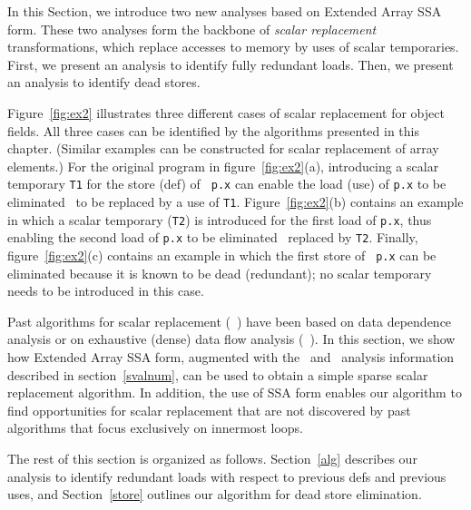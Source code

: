 In this Section, we introduce two new analyses based on Extended
Array SSA form.  These two analyses form the backbone of 
{\em scalar replacement} transformations, which replace accesses
to memory by uses of scalar temporaries.  First, we present an
analysis to identify fully redundant loads.  Then, we present an
analysis to identify dead stores.

Figure~\ref{fig:ex2} illustrates three different cases of scalar
replacement for object fields. 
All three cases can be identified by the algorithms presented in this chapter.
(Similar examples can 
be constructed for scalar replacement of array elements.)
For the original program in figure~\ref{fig:ex2}(a),
introducing a scalar temporary {\tt T1} for the store (def) of {\tt
p.x} can enable the load (use) of {\tt p.x} to be eliminated \ie\ to
be replaced by a use of {\tt T1}.  Figure~\ref{fig:ex2}(b)
contains an example in which a scalar temporary ({\tt T2}) is
introduced for the first load of {\tt p.x}, thus enabling the second
load of {\tt p.x} to be eliminated \ie\ replaced by {\tt T2}.  Finally,
figure~\ref{fig:ex2}(c) contains an example in which the first store of {\tt
p.x} can be eliminated because it is known to be dead (redundant); no
scalar temporary needs to be introduced in this case.


Past algorithms for scalar replacement (\eg\ \cite{CaCK90,BoGu95})
have been based on data dependence analysis or on exhaustive (dense)
data flow analysis (\eg\ \cite{CaKe94}).  In this section, we show how
Extended Array SSA form, augmented with the \ds\ and \dd\ analysis information
described in section~\ref{svalnum}, can be used to obtain a simple sparse
scalar replacement algorithm.  In addition, the use of SSA form
enables our algorithm to find opportunities for
scalar replacement that are not discovered by past algorithms that
focus exclusively on innermost loops.  

The rest of this section is organized as follows.
Section~\ref{alg} describes our analysis to identify
redundant loads with respect to previous defs and previous uses,
and Section~\ref{store} outlines
our algorithm for dead store elimination.

